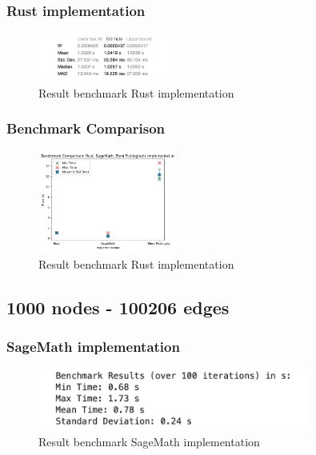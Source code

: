 \subsubsection*{Rust implementation}
\begin{figure}[!h]
    \centering
    \includegraphics[width=0.40\textwidth]{images/benchmark/graph_800_63378/benchmark_graph_800_63378_rust}
    \caption{Result benchmark Rust implementation}
    \label{fig:benchmark-graph-800-63378-rust}
\end{figure}

\subsubsection*{Benchmark Comparison}
\begin{figure}[!h]
    \centering
    \includegraphics[width=0.40\textwidth]{images/benchmark/graph_800_63378/benchmark_comparison_graph_800_63378}
    \caption{Result benchmark Rust implementation}
    \label{fig:benchmark-comparison-graph-800-63378}
\end{figure}

\newpage


\subsection{1000 nodes - 100206 edges}\label{subsec:result-for-graphs-1000-100206}

\subsubsection*{SageMath implementation}
\begin{figure}[!h]
    \centering
    \includegraphics[width=0.80\textwidth]{images/benchmark/graph_1000_100206/benchmark_graph_1000_100206_sagemath}
    \caption{Result benchmark SageMath implementation}
    \label{fig:benchmark-graph-1000-100206-sagemath}
\end{figure}



